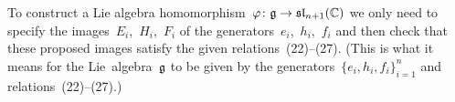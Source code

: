 \section{}





\subsection{}

To construct a Lie algebra homomorphism~$\varphi \colon \mathfrak{g} \to \mathfrak{sl}_{n+1}(\mathbb{C})$ we only need to specify the images~$E_i$,~$H_i$,~$F_i$ of the generators~$e_i$,~$h_i$,~$f_i$ and then check that these proposed images satisfy the given relations~(22)--(27).
(This is what it means for the Lie~algebra~$\mathfrak{g}$ to be given by the generators~$\{ e_i, h_i, f_i \}_{i=1}^n$ and relations~(22)--(27).)

